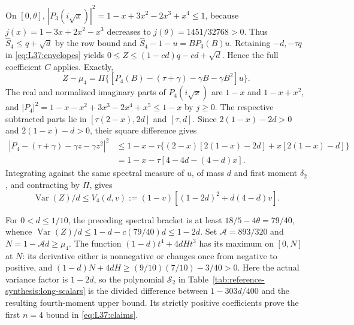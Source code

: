 On $[0,\theta]$,
$|P_3(i\sqrt x)|^2=1-x+3x^2-2x^3+x^4\le1$,
because $j(x)=1-3x+2x^2-x^3$ decreases to
$j(\theta)=1451/32768>0$.
Thus $\widehat S_4\le q+\sqrt d$ by the row bound and
$\widehat S_4-1-u=BP_3(B)u$.
Retaining $-d,-\tau q$ in \eqref{eq:L37:envelopes} yields
$0\le Z\le(1-cd)q-cd+\sqrt d$. Hence the full coefficient $C$ applies.
Exactly,
\[
Z-\mu_4=\Pi\{[P_4(B)-(\tau+\gamma)-\gamma B-\gamma B^2]u\}.
\]
The real and normalized imaginary parts of $P_4(i\sqrt x)$ are
$1-x$ and $1-x+x^2$, and
$|P_4|^2=1-x-x^2+3x^3-2x^4+x^5\le1-x$ by $j\ge0$.
The respective subtracted parts lie in $[\tau(2-x),2d]$ and $[\tau,d]$.
Since $2(1-x)-2d>0$ and $2(1-x)-d>0$, their square difference gives
\[
\begin{aligned}
|P_4-(\tau+\gamma)-\gamma z-\gamma z^2|^2
&\le1-x-\tau\{(2-x)[2(1-x)-2d]+x[2(1-x)-d]\}\\
&=1-x-\tau[4-4d-(4-d)x].
\end{aligned}
\]
Integrating against the same spectral measure of $u$, of mass $d$ and
first moment $\delta_2$, and contracting by $\Pi$, gives
\begin{equation}\tag{L37.3.8}\label{eq:L37:V4}
\operatorname{Var}(Z)/d\le V_4(d,v):=(1-v)[(1-2d)^2+d(4-d)v].
\end{equation}

For $0<d\le1/10$, the preceding spectral bracket is at least
$18/5-4\theta=79/40$, whence
$\operatorname{Var}(Z)/d\le1-d-c(79/40)d\le1-2d$.
Set $\mathcal A=893/320$ and $N=1-\mathcal A d\ge\mu_4$.
The function $(1-d)t^4+4dHt^3$ has its maximum on $[0,N]$ at $N$:
its derivative either is nonnegative or changes once from negative to
positive, and $(1-d)N+4dH\ge(9/10)(7/10)-3/40>0$.
Here the actual variance factor is \(1-2d\), so the polynomial
\(\mathcal S_2\) in Table~\ref{tab:reference-synthesis:long-scalars}
is the divided difference between \(1-303d/400\) and the resulting
fourth-moment upper bound. Its strictly positive coefficients prove
the first \(n=4\) bound in \eqref{eq:L37:claims}.

